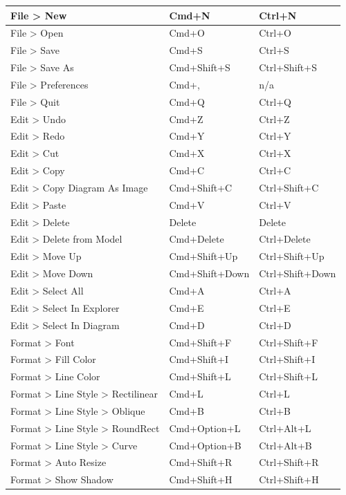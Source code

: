 \documentclass[a4paper,12pt]{report}
\begin{document}
\begin{longtable}{|l|l|l|}
			File > New & Cmd+N & Ctrl+N  \\\hline
			File > Open & Cmd+O & Ctrl+O \\ \hline
			File > Save & Cmd+S & Ctrl+S \\ \hline
			File > Save As & Cmd+Shift+S & Ctrl+Shift+S \\ \hline
			File > Preferences & Cmd+, & n/a \\ \hline
			File > Quit & Cmd+Q & Ctrl+Q \\ \hline
			Edit > Undo & Cmd+Z & Ctrl+Z \\ \hline
			Edit > Redo & Cmd+Y & Ctrl+Y \\ \hline
			Edit > Cut & Cmd+X & Ctrl+X \\ \hline
			Edit > Copy & Cmd+C & Ctrl+C \\ \hline
			Edit > Copy Diagram As Image & Cmd+Shift+C & Ctrl+Shift+C \\ \hline
			Edit > Paste & Cmd+V & Ctrl+V \\ \hline
			Edit > Delete & Delete & Delete \\ \hline
			Edit > Delete from Model & Cmd+Delete & Ctrl+Delete \\ \hline
			Edit > Move Up & Cmd+Shift+Up & Ctrl+Shift+Up \\ \hline
			Edit > Move Down & Cmd+Shift+Down & Ctrl+Shift+Down \\ \hline
			Edit > Select All & Cmd+A & Ctrl+A \\ \hline
			Edit > Select In Explorer & Cmd+E & Ctrl+E \\ \hline
			Edit > Select In Diagram & Cmd+D & Ctrl+D \\ \hline
			Format > Font & Cmd+Shift+F & Ctrl+Shift+F \\ \hline
			Format > Fill Color & Cmd+Shift+I & Ctrl+Shift+I \\ \hline
			Format > Line Color & Cmd+Shift+L & Ctrl+Shift+L \\ \hline
			Format > Line Style > Rectilinear & Cmd+L & Ctrl+L \\ \hline
			Format > Line Style > Oblique & Cmd+B & Ctrl+B \\ \hline
			Format > Line Style > RoundRect & Cmd+Option+L & Ctrl+Alt+L \\ \hline
			Format > Line Style > Curve & Cmd+Option+B & Ctrl+Alt+B \\ \hline
			Format > Auto Resize & Cmd+Shift+R & Ctrl+Shift+R \\ \hline
			Format > Show Shadow & Cmd+Shift+H & Ctrl+Shift+H \\ \hline

\end{longtable}
\end{document}
